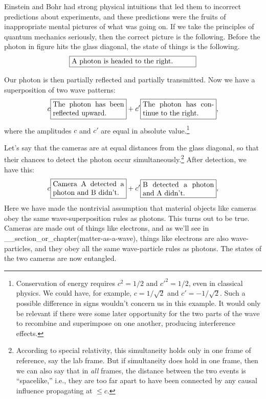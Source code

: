 Einstein and Bohr had strong physical intuitions that led them to
incorrect predictions about experiments, and these predictions were
the fruits of inappropriate mental pictures of what was going on. If we take
the principles of quantum mechanics seriously, then the correct picture
is the following. Before the photon in figure  hits the glass
diagonal, the state of things is the following.
\begin{equation*}
\fbox{\parbox{60mm}{A photon is headed to the right.}}
\end{equation*}

Our photon is then partially reflected and partially transmitted. Now we have
a superposition of two wave patterns:
\begin{equation*}
 c\fbox{\parbox{35mm}{The photon has been reflected upward.}}
+c'\fbox{\parbox{35mm}{The photon has continue to the right.}},
\end{equation*}
where the amplitudes $c$ and $c'$ are equal in absolute value.\footnote{
Conservation of energy requires $c^2=1/2$ and $c'^2=1/2$,
even in classical physics. We could have, for
example, $c=1/\sqrt{2}$ and $c'=-1/\sqrt{2}$. Such a possible difference in
signs wouldn't concern us in this example. It would only be relevant if there
were some later opportunity for the two parts of the wave to recombine and
superimpose on one another, producing interference effects.}

Let's say that the cameras are at equal distances from the glass diagonal,
so that their chances to detect the photon occur simultaneously.\footnote{
According to special relativity, this simultaneity holds only in one frame
of reference, say the lab frame. But if simultaneity does hold in one frame,
then we can also say that in \emph{all} frames, the distance between the two
events is ``spacelike,'' i.e., they are too far apart to have been connected
by any causal influence propagating at $\le c$.
}
After detection, we have this:
\begin{equation*}
 c\fbox{\parbox{35mm}{Camera A detected a photon and B didn't.}}
+c'\fbox{\parbox{35mm}{B detected a photon and A didn't.}},
\end{equation*}
Here we have made the nontrivial assumption that material objects like
cameras obey the same wave-superposition rules as photons. This turns out
to be true. Cameras are made out of things like electrons,
and as we'll see in __section_or_chapter(matter-as-a-wave), things like
electrons are also wave-particles, and they obey all the same wave-particle rules
as photons. The states of the two cameras are now entangled.

